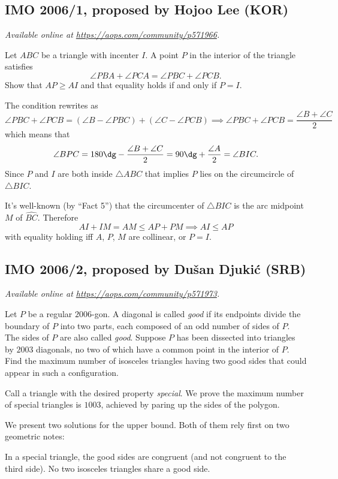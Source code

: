 \documentclass[11pt]{scrartcl}
\begin{document}
\subsection{IMO 2006/1, proposed by Hojoo Lee (KOR)}
\textsl{Available online at \url{https://aops.com/community/p571966}.}
\begin{mdframed}[style=mdpurplebox,frametitle={Problem statement}]
Let $ABC$ be a triangle with incenter $I$.
A point $P$ in the interior of the triangle satisfies
\[ \angle PBA + \angle PCA = \angle PBC + \angle PCB. \]
Show that $AP \ge AI$ and that equality holds if and only if $P=I$.
\end{mdframed}
The condition rewrites as
\[
  \angle PBC + \angle PCB
  = (\angle B - \angle PBC)
  + (\angle C - \angle PCB)
  \implies
  \angle PBC + \angle PCB = \frac{\angle B + \angle C}{2}
\]
which means that
\[ \angle BPC = 180\dg - \frac{\angle B + \angle C}{2}
  = 90\dg + \frac{\angle A}{2}
  = \angle BIC.
\]
Since $P$ and $I$ are both inside $\triangle ABC$
that implies $P$ lies on the circumcircle of $\triangle BIC$.

It's well-known (by ``Fact 5'') that the circumcenter
of $\triangle BIC$ is the arc midpoint $M$ of $\widehat{BC}$.
Therefore
\[ AI + IM = AM \le AP + PM \implies AI \le AP \]
with equality holding iff $A$, $P$, $M$ are collinear, or $P=I$.
\pagebreak

\subsection{IMO 2006/2, proposed by Dušan Djukić (SRB)}
\textsl{Available online at \url{https://aops.com/community/p571973}.}
\begin{mdframed}[style=mdpurplebox,frametitle={Problem statement}]
Let $P$ be a regular $2006$-gon.
A diagonal is called \emph{good} if its endpoints
divide the boundary of $P$ into two parts,
each composed of an odd number of sides of $P$.
The sides of $P$ are also called \emph{good}.
Suppose $P$ has been dissected into triangles by $2003$ diagonals,
no two of which have a common point in the interior of $P$.
Find the maximum number of isosceles triangles having two good
sides that could appear in such a configuration.
\end{mdframed}
Call a triangle with the desired property \emph{special}.
We prove the maximum number of special triangles is $1003$,
achieved by paring up the sides of the polygon.

We present two solutions for the upper bound.
Both of them rely first on two geometric notes:
\begin{itemize}
  \ii In a special triangle, the good sides are congruent
  (and not congruent to the third side).
  \ii No two isosceles triangles share a good side.
\end{itemize}
\end{document}
